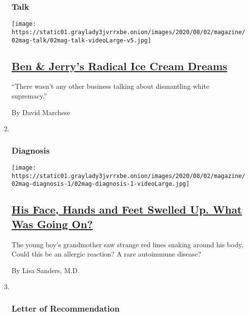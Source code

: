 \begin{enumerate}
{  \subsubsection{Talk}\label{talk-1}}

  \texttt{[image: https://static01.graylady3jvrrxbe.onion/images/2020/08/02/magazine/02mag-talk/02mag-talk-videoLarge-v5.jpg]}

  \hypertarget{ben--jerrys-radical-ice-cream-dreams}{%
  \subsection{\texorpdfstring{\href{/interactive/2020/07/27/magazine/ben-jerry-interview.html}{Ben
  \& Jerry's Radical Ice Cream
  Dreams}}{Ben \& Jerry's Radical Ice Cream Dreams}}\label{ben--jerrys-radical-ice-cream-dreams}}

  ``There wasn't any other business talking about dismantling white
  supremacy.''

  By David Marchese
\item ~
  \hypertarget{diagnosis}{%
  \subsubsection{Diagnosis}\label{diagnosis}}

  \texttt{[image: https://static01.graylady3jvrrxbe.onion/images/2020/08/02/magazine/02mag-diagnosis-1/02mag-diagnosis-1-videoLarge.jpg]}

  \hypertarget{his-face-hands-and-feet-swelled-up-what-was-going-on}{%
  \subsection{\texorpdfstring{\href{/2020/07/30/magazine/urticaria-multiforme.html}{His
  Face, Hands and Feet Swelled Up. What Was Going
  On?}}{His Face, Hands and Feet Swelled Up. What Was Going On?}}\label{his-face-hands-and-feet-swelled-up-what-was-going-on}}

  The young boy's grandmother saw strange red lines snaking around his
  body. Could this be an allergic reaction? A rare autoimmune disease?

  By Lisa Sanders, M.D.
\item ~
  \hypertarget{letter-of-recommendation}{%
  \subsubsection{Letter of
  Recommendation}\label{letter-of-recommendation}}


\end{enumerate}
